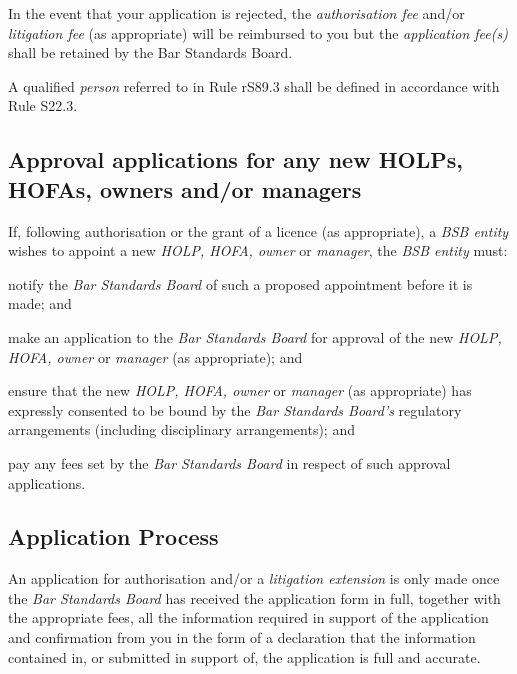 
In the event that your application is rejected, the \emph{authorisation
fee} and/or \emph{litigation fee} (as appropriate) will be reimbursed to
you but the \emph{application fee(s)} shall be retained by the Bar
Standards Board.


A qualified \emph{person} referred to in Rule rS89.3 shall be defined in
accordance with Rule S22.3.



\subsection{Approval applications for any new HOLPs, HOFAs, owners and/or
managers}


If, following authorisation or the grant of a licence (as appropriate),
a \emph{BSB entity} wishes to appoint a new \emph{HOLP, HOFA, owner} or
\emph{manager}, the \emph{BSB entity} must:\nl\item notify the \emph{Bar Standards Board} of such a proposed appointment
before it is made; and
\item make an application to the \emph{Bar Standards Board} for approval of
the new \emph{HOLP, HOFA, owner} or \emph{manager} (as appropriate); and
\item ensure that the new \emph{HOLP, HOFA, owner} or \emph{manager} (as
appropriate) has expressly consented to be bound by the \emph{Bar
Standards Board's} regulatory arrangements (including disciplinary
arrangements); and
\item pay any fees set by the \emph{Bar Standards Board} in respect of such
approval applications.
\ln
\subsection{Application Process}


An application for authorisation and/or a \emph{litigation extension} is
only made once the \emph{Bar Standards Board} has received the
application form in full, together with the appropriate fees, all the
information required in support of the application and confirmation from
you in the form of a declaration that the information contained in, or
submitted in support of, the application is full and accurate.

